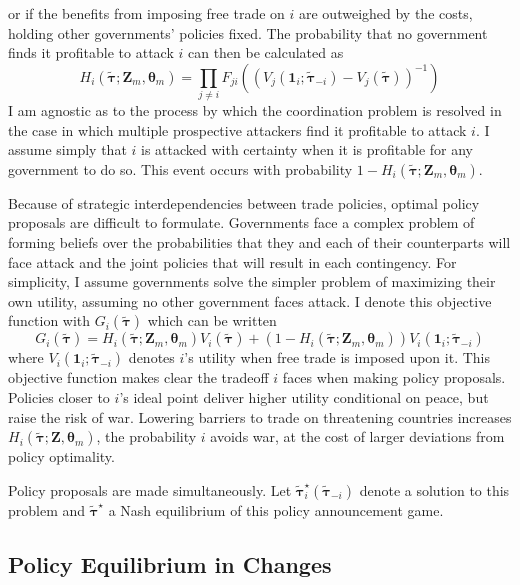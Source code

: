 \documentclass{puthesis}
\begin{document}
or if the benefits from imposing free trade on \(i\) are outweighed by
the costs, holding other governments' policies fixed. The probability
that no government finds it profitable to attack \(i\) can then be
calculated as \[
H_i \left( \tilde{\bm{\tau}}; \bm{Z}_m, \bm{\theta}_m \right) = \prod_{j \neq i} F_{ji} \left( \left( V_j \left( \bm{1}_i; \tilde{\bm{\tau}}_{-i} \right) - V_j \left( \tilde{\bm{\tau}} \right) \right)^{-1} \right)
\] I am agnostic as to the process by which the coordination problem is
resolved in the case in which multiple prospective attackers find it
profitable to attack \(i\). I assume simply that \(i\) is attacked with
certainty when it is profitable for any government to do so. This event
occurs with probability
\(1 - H_i(\tilde{\bm{\tau}}; \bm{Z}_m, \bm{\theta}_m)\).

Because of strategic interdependencies between trade policies, optimal
policy proposals are difficult to formulate. Governments face a complex
problem of forming beliefs over the probabilities that they and each of
their counterparts will face attack and the joint policies that will
result in each contingency. For simplicity, I assume governments solve
the simpler problem of maximizing their own utility, assuming no other
government faces attack. I denote this objective function with
\(G_i(\tilde{\bm{\tau}})\) which can be written
\begin{equation} \label{eq:G}
G_i(\tilde{\bm{\tau}}) = H_i(\tilde{\bm{\tau}}; \bm{Z}_m, \bm{\theta}_m) V_i(\tilde{\bm{\tau}}) + \left( 1 - H_i(\tilde{\bm{\tau}}; \bm{Z}_m, \bm{\theta}_m) \right) V_i(\bm{1}_i; \tilde{\bm{\tau}}_{-i})
\end{equation} where \(V_i(\bm{1}_i; \tilde{\bm{\tau}}_{-i})\) denotes
\(i\)'s utility when free trade is imposed upon it. This objective
function makes clear the tradeoff \(i\) faces when making policy
proposals. Policies closer to \(i\)'s ideal point deliver higher utility
conditional on peace, but raise the risk of war. Lowering barriers to
trade on threatening countries increases
\(H_i(\tilde{\bm{\tau}}; \bm{Z}, \bm{\theta}_m)\), the probability \(i\)
avoids war, at the cost of larger deviations from policy optimality.

Policy proposals are made simultaneously. Let
\(\tilde{\bm{\tau}}_i^\star(\tilde{\bm{\tau}}_{-i})\) denote a solution
to this problem and \(\tilde{\bm{\tau}}^\star\) a Nash equilibrium of
this policy announcement game.

\subsection{Policy Equilibrium in Changes}
\end{document}
